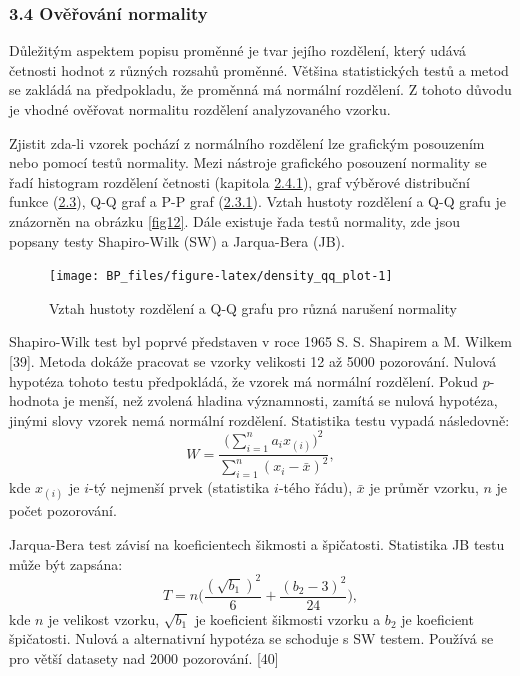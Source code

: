 \documentclass[12pt,]{article}
\begin{document}
\hypertarget{normtests}{\subsubsection{3.4 Ověřování
normality}\label{normtests}}

\qquad Důležitým aspektem popisu proměnné je tvar jejího rozdělení,
který udává četnosti hodnot z různých rozsahů proměnné. Většina
statistických testů a metod se zakládá na předpokladu, že proměnná má
normální rozdělení. Z tohoto důvodu je vhodné ověřovat normalitu
rozdělení analyzovaného vzorku.

\qquad Zjistit zda-li vzorek pochází z normálního rozdělení lze
grafickým posouzením nebo pomocí testů normality. Mezi nástroje
grafického posouzení normality se řadí histogram rozdělení četnosti
(kapitola \protect\hyperlink{hist}{2.4.1}), graf výběrové distribuční
funkce (\protect\hyperlink{distribution}{2.3}), Q-Q graf a P-P graf
(\protect\hyperlink{qqpp}{2.3.1}). Vztah hustoty rozdělení a Q-Q grafu
je znázorněn na obrázku \ref{fig12}. Dále existuje řada testů normality,
zde jsou popsany testy Shapiro-Wilk (SW) a Jarqua-Bera (JB).

\begin{figure}[H]

{\centering \texttt{[image: BP\_files/figure-latex/density\_qq\_plot-1]} 

}

\caption{\label{fig12} Vztah hustoty rozdělení a Q-Q grafu pro různá narušení normality}\label{fig:density_qq_plot}
\end{figure}

\qquad Shapiro-Wilk test byl poprvé představen v roce 1965 S. S.
Shapirem a M. Wilkem {[}39{]}. Metoda dokáže pracovat se vzorky
velikosti 12 až 5000 pozorování. Nulová hypotéza tohoto testu
předpokládá, že vzorek má normální rozdělení. Pokud \(p\)-hodnota je
menší, než zvolená hladina významnosti, zamítá se nulová hypotéza,
jinými slovy vzorek nemá normální rozdělení. Statistika testu vypadá
následovně:
\[W = \frac{\big(\sum \limits^n_{i=1} a_i x_{(i)}\big)^2}{\sum \limits^n_{i=1}(x_i - \bar{x})^2},\]
kde \(x_{(i)}\) je \(i\)-tý nejmenší prvek (statistika \(i\)-tého řádu),
\(\bar{x}\) je průměr vzorku, \(n\) je počet pozorování.

\qquad Jarqua-Bera test závisí na koeficientech šikmosti a špičatosti.
Statistika JB testu může být zapsána:
\[T = n \bigg( \frac{(\sqrt{b_1})^2}{6} + \frac{(b_2 - 3)^2}{24} \bigg),\]
kde \(n\) je velikost vzorku, \(\sqrt{b_1}\) je koeficient šikmosti
vzorku a \(b_2\) je koeficient špičatosti. Nulová a alternativní
hypotéza se schoduje s SW testem. Používá se pro větší datasety nad 2000
pozorování. {[}40{]} \newpage
\end{document}
